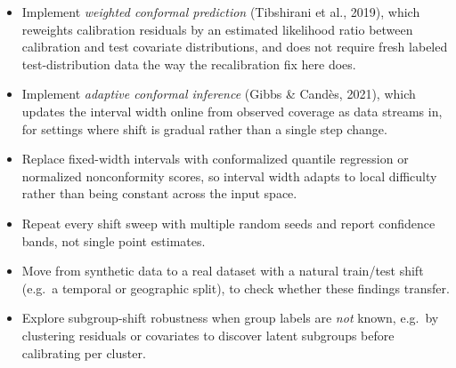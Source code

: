\documentclass[11pt]{article}
\begin{document}
\begin{itemize}
  \item Implement \emph{weighted conformal prediction} (Tibshirani et al., 2019),
    which reweights calibration residuals by an estimated likelihood ratio between
    calibration and test covariate distributions, and does not require fresh
    labeled test-distribution data the way the recalibration fix here does.
  \item Implement \emph{adaptive conformal inference} (Gibbs \& Candès, 2021), which
    updates the interval width online from observed coverage as data streams in,
    for settings where shift is gradual rather than a single step change.
  \item Replace fixed-width intervals with conformalized quantile regression or
    normalized nonconformity scores, so interval width adapts to local difficulty
    rather than being constant across the input space.
  \item Repeat every shift sweep with multiple random seeds and report confidence
    bands, not single point estimates.
  \item Move from synthetic data to a real dataset with a natural train/test shift
    (e.g.\ a temporal or geographic split), to check whether these findings
    transfer.
  \item Explore subgroup-shift robustness when group labels are \emph{not} known,
    e.g.\ by clustering residuals or covariates to discover latent subgroups before
    calibrating per cluster.
\end{itemize}
\end{document}
